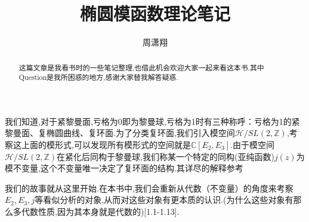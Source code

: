 \documentclass[12pt,A4paper,oneside]{amsart}
\numberwithin{equation}{section}
\theoremstyle{plain}
\theoremstyle{plain}
\theoremstyle{plain}
\numberwithin{equation}{section}
\theoremstyle{remark}
\begin{document}
\title[]{\LARGE 椭圆模函数理论笔记}


\author[]{\large 周潇翔}
\address{School of Mathematical Sciences\\
University of Science and Technology of China\\
Hefei, 230026\\ P.R. China\\}
\maketitle




\begin{abstract}
这篇文章是我看书\cite{klein1892vorlesungen}时的一些笔记整理,也借此机会欢迎大家一起来看这本书.其中Question是我所困惑的地方,感谢大家替我解答疑惑.
\end{abstract}




我们知道,对于紧黎曼面,亏格为0即为黎曼球,亏格为1时有三种称呼：亏格为1的紧黎曼面、复椭圆曲线、复环面.为了分类复环面,我们引入模空间$\mathcal{H}/SL(2,\mathbb{Z})$,考察这上面的模形式,可以发现所有模形式的空间就是$\mathbb{C}[E_2,E_3]$.由于模空间$\mathcal{H}/SL(2,\mathbb{Z})$在紧化后同构于黎曼球,我们称某一个特定的同构(亚纯函数)$j(z)$为模不变量,这个不变量唯一决定了复环面的结构.其详尽的解释参考\cite[第二,八章]{Li2019modularform}

我们的故事就从这里开始.在本书中,我们会重新从代数（不变量）的角度来考察$E_2,E_3,j$等看似分析的对象,从而对这些对象有更本质的认识.(为什么这些对象有那么多代数性质,因为其本身就是代数的)[1.1-1.13].
\end{document}

